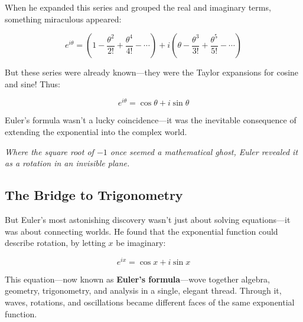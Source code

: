When he expanded this series and grouped the real and imaginary terms, something miraculous appeared:

\[
e^{i\theta} = \left(1 - \frac{\theta^2}{2!} + \frac{\theta^4}{4!} - \cdots\right) + i\left(\theta - \frac{\theta^3}{3!} + \frac{\theta^5}{5!} - \cdots\right)
\]

But these series were already known—they were the Taylor expansions for cosine and sine! Thus:

\[
e^{i\theta} = \cos \theta + i \sin \theta
\]

Euler’s formula wasn’t a lucky coincidence—it was the inevitable consequence of extending the exponential into the complex world.

\vspace{1em}

\begin{center}
\textit{Where the square root of \(-1\) once seemed a mathematical ghost, Euler revealed it as a rotation in an invisible plane.}
\end{center}



\subsection{The Bridge to Trigonometry}

But Euler’s most astonishing discovery wasn’t just about solving equations—it was about connecting worlds. He found that the exponential function could describe rotation, by letting \( x \) be imaginary:

\[
e^{ix} = \cos x + i \sin x
\]

This equation—now known as \textbf{Euler’s formula}—wove together algebra, geometry, trigonometry, and analysis in a single, elegant thread. Through it, waves, rotations, and oscillations became different faces of the same exponential function.


\vspace{1em}

